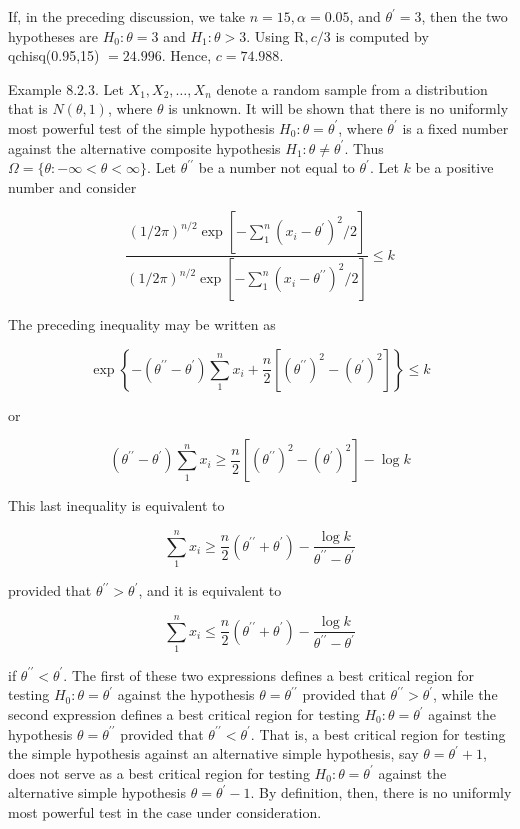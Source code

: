 If, in the preceding discussion, we take $n=15, \alpha=0.05$, and $\theta^{\prime}=3$, then the two hypotheses are $H_{0}: \theta=3$ and $H_{1}: \theta>3$. Using $\mathrm{R}, c / 3$ is computed by qchisq(0.95,15) $=24.996$. Hence, $c=74.988$.

Example 8.2.3. Let $X_{1}, X_{2}, \ldots, X_{n}$ denote a random sample from a distribution that is $N(\theta, 1)$, where $\theta$ is unknown. It will be shown that there is no uniformly most powerful test of the simple hypothesis $H_{0}: \theta=\theta^{\prime}$, where $\theta^{\prime}$ is a fixed number against the alternative composite hypothesis $H_{1}: \theta \neq \theta^{\prime}$. Thus $\Omega=\{\theta:-\infty<\theta<\infty\}$. Let $\theta^{\prime \prime}$ be a number not equal to $\theta^{\prime}$. Let $k$ be a positive number and consider

$$
\frac{(1 / 2 \pi)^{n / 2} \exp \left[-\sum_{1}^{n}\left(x_{i}-\theta^{\prime}\right)^{2} / 2\right]}{(1 / 2 \pi)^{n / 2} \exp \left[-\sum_{1}^{n}\left(x_{i}-\theta^{\prime \prime}\right)^{2} / 2\right]} \leq k
$$

The preceding inequality may be written as

$$
\exp \left\{-\left(\theta^{\prime \prime}-\theta^{\prime}\right) \sum_{1}^{n} x_{i}+\frac{n}{2}\left[\left(\theta^{\prime \prime}\right)^{2}-\left(\theta^{\prime}\right)^{2}\right]\right\} \leq k
$$

or

$$
\left(\theta^{\prime \prime}-\theta^{\prime}\right) \sum_{1}^{n} x_{i} \geq \frac{n}{2}\left[\left(\theta^{\prime \prime}\right)^{2}-\left(\theta^{\prime}\right)^{2}\right]-\log k
$$

This last inequality is equivalent to

$$
\sum_{1}^{n} x_{i} \geq \frac{n}{2}\left(\theta^{\prime \prime}+\theta^{\prime}\right)-\frac{\log k}{\theta^{\prime \prime}-\theta^{\prime}}
$$

provided that $\theta^{\prime \prime}>\theta^{\prime}$, and it is equivalent to

$$
\sum_{1}^{n} x_{i} \leq \frac{n}{2}\left(\theta^{\prime \prime}+\theta^{\prime}\right)-\frac{\log k}{\theta^{\prime \prime}-\theta^{\prime}}
$$

if $\theta^{\prime \prime}<\theta^{\prime}$. The first of these two expressions defines a best critical region for testing $H_{0}: \theta=\theta^{\prime}$ against the hypothesis $\theta=\theta^{\prime \prime}$ provided that $\theta^{\prime \prime}>\theta^{\prime}$, while the second expression defines a best critical region for testing $H_{0}: \theta=\theta^{\prime}$ against the hypothesis $\theta=\theta^{\prime \prime}$ provided that $\theta^{\prime \prime}<\theta^{\prime}$. That is, a best critical region for testing the simple hypothesis against an alternative simple hypothesis, say $\theta=\theta^{\prime}+1$, does not serve as a best critical region for testing $H_{0}: \theta=\theta^{\prime}$ against the alternative simple hypothesis $\theta=\theta^{\prime}-1$. By definition, then, there is no uniformly most powerful test in the case under consideration.

